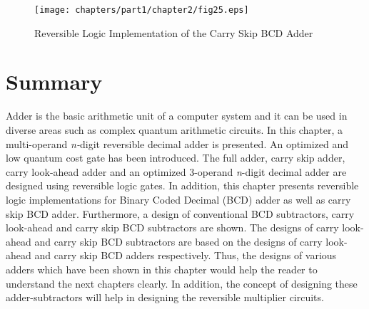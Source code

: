 \begin{figure}[!tbh]
	\centering
	\texttt{[image: chapters/part1/chapter2/fig25.eps]}
	\caption{Reversible Logic Implementation of the Carry Skip BCD Adder}
	\label{fig:p1_c2_fig25}
\end{figure}
\section{Summary}

Adder is the basic arithmetic unit of a computer system and it can be used in diverse areas such as complex quantum arithmetic circuits. In this chapter, a multi-operand {\it n-}digit reversible decimal adder is presented. An optimized and low quantum cost gate has been introduced. The full adder, carry skip adder, carry look-ahead adder and an optimized 3-operand {\it n}-digit decimal adder are designed using reversible logic gates. In addition, this chapter presents reversible logic implementations for Binary Coded Decimal (BCD) adder as well as carry skip BCD adder. Furthermore, a design of conventional BCD subtractors, carry look-ahead and carry skip BCD subtractors are shown. The designs of carry look-ahead and carry skip BCD subtractors are based on the designs of carry look-ahead and carry skip BCD adders respectively. Thus, the designs of various adders which have been shown in this chapter would help the reader to understand the next chapters clearly. In addition, the concept of designing these adder-subtractors will help in designing the reversible multiplier circuits.